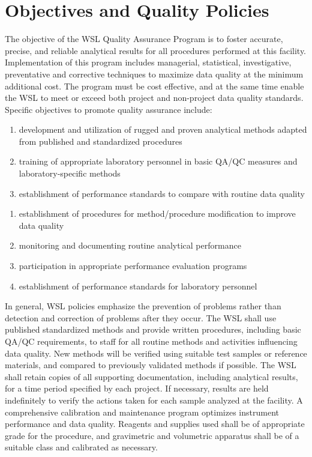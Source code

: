 \section{Objectives and Quality Policies }
The objective of the WSL Quality Assurance Program is to foster 
accurate, precise, and reliable analytical results for all procedures 
performed at this facility. Implementation of this program includes 
managerial, statistical, investigative, preventative and corrective 
techniques to maximize data quality at the minimum additional cost. The 
program must be cost effective, and at the same time enable the WSL to 
meet or exceed both project and non-project data quality standards. 
Specific objectives to promote quality assurance include: 

\begin{enumerate}
	\item development and utilization of rugged and proven analytical methods adapted from published and standardized procedures 
	\item training of appropriate laboratory personnel in basic QA/QC measures and laboratory-specific methods 
	\item establishment of performance standards to compare with routine data quality
\setcounter{numberedCntF}{\theenumi}
\end{enumerate}


\begin{enumerate}
\setcounter{enumi}{\thenumberedCntF}
	\item establishment of procedures for method/procedure modification to improve data quality
	\item monitoring and documenting routine analytical performance
	\item participation in appropriate performance evaluation programs
	\item establishment of performance standards for laboratory personnel 
\setcounter{numberedCntF}{\theenumi}
\end{enumerate}


In general, WSL policies emphasize the prevention of problems rather 
than detection and correction of problems after they occur. The WSL 
shall use published standardized methods and provide written procedures, 
including basic QA/QC requirements, to staff for all routine methods and 
activities influencing data quality. New methods will be verified using 
suitable test samples or reference materials, and compared to previously 
validated methods if possible. The WSL shall retain copies of all 
supporting documentation, including analytical results, for a time 
period specified by each project. If necessary, results are held 
indefinitely to verify the actions taken for each sample analyzed at the 
facility. A comprehensive calibration and maintenance program optimizes 
instrument performance and data quality. Reagents and supplies used 
shall be of appropriate grade for the procedure, and gravimetric and 
volumetric apparatus shall be of a suitable class and calibrated as 
necessary. 

